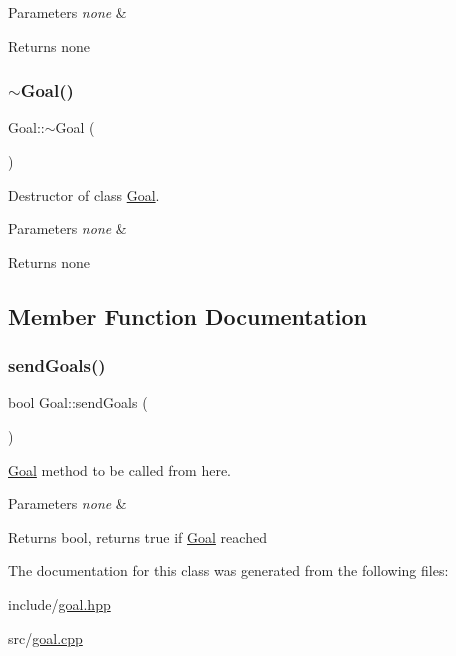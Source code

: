 \begin{DoxyParams}{Parameters}
{\em none} & \\
\hline
\end{DoxyParams}
\begin{DoxyReturn}{Returns}
none 
\end{DoxyReturn}
\mbox{\label{class_goal_a0719b571c7c6995948a2c55137459535}} 
\subsubsection{\texorpdfstring{$\sim$\+Goal()}{~Goal()}}
{\footnotesize\ttfamily Goal\+::$\sim$\+Goal (\begin{DoxyParamCaption}{ }\end{DoxyParamCaption})}



Destructor of class \hyperlink{class_goal}{Goal}. 


\begin{DoxyParams}{Parameters}
{\em none} & \\
\hline
\end{DoxyParams}
\begin{DoxyReturn}{Returns}
none 
\end{DoxyReturn}


\subsection{Member Function Documentation}
\mbox{\label{class_goal_af70832313448e78fc425e039969e8a6e}} 
\subsubsection{\texorpdfstring{send\+Goals()}{sendGoals()}}
{\footnotesize\ttfamily bool Goal\+::send\+Goals (\begin{DoxyParamCaption}{ }\end{DoxyParamCaption})}



\hyperlink{class_goal}{Goal} method to be called from here. 


\begin{DoxyParams}{Parameters}
{\em none} & \\
\hline
\end{DoxyParams}
\begin{DoxyReturn}{Returns}
bool, returns true if \hyperlink{class_goal}{Goal} reached 
\end{DoxyReturn}


The documentation for this class was generated from the following files\+:\begin{DoxyCompactItemize}
\item 
include/\hyperlink{goal_8hpp}{goal.\+hpp}\item 
src/\hyperlink{goal_8cpp}{goal.\+cpp}\end{DoxyCompactItemize}
